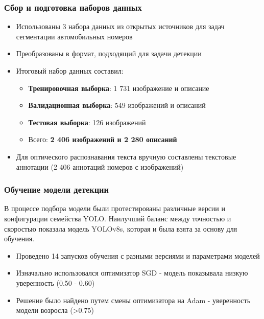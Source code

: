 \documentclass{beamer}
\begin{document}

\begin{frame}
\frametitle{Сбор и подготовка наборов данных}

\begin{itemize}
    \item Использованы 3 набора данных из открытых источников для задач сегментации автомобильных номеров \vspace{0.3em}
    \item Преобразованы в формат, подходящий для задачи детекции\vspace{0.3em}
    \item Итоговый набор данных составил:\vspace{0.3em}
    \begin{itemize}
        \item \textbf{Тренировочная выборка}: 1 731 изображение и описание \vspace{0.3em}
        \item \textbf{Валидационная выборка}: 549 изображений и описаний \vspace{0.3em}
        \item \textbf{Тестовая выборка}: 126 изображений \vspace{0.3em}
        \item Всего: \textbf{2 406 изображений и 2 280 описаний} \vspace{0.3em}
    \end{itemize}
    \item Для оптического распознавания текста вручную составлены текстовые аннотации (2 406 аннотаций номеров с изображений)
\end{itemize}
\end{frame}


\begin{frame}
\frametitle{Обучение модели детекции}

В процессе подбора модели были протестированы различные версии и конфигурации семейства YOLO. Наилучший баланс между точностью и скоростью показала модель YOLOv8s, которая и была взята за основу для обучения.
\begin{itemize}
    \item Проведено 14 запусков обучения с разными версиями и параметрами моделей
    \item Изначально использовался оптимизатор SGD - модель показывала низкую уверенность (0.50 - 0.60)
    \item Решение было найдено путем смены оптимизатора на Adam  - уверенность модели возросла (>0.75)
\end{itemize}
\end{frame}
\end{document}
